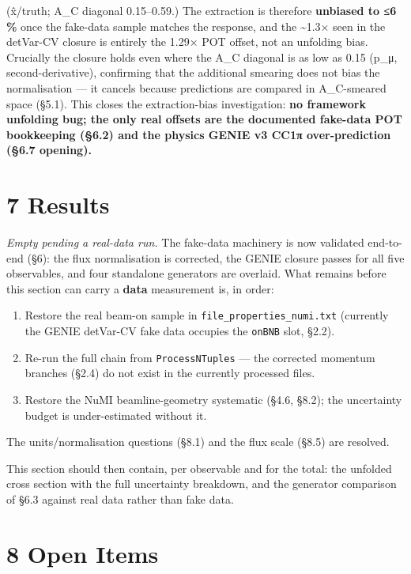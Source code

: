 \documentclass[11pt]{article}
\begin{document}
(x̂/truth; A\_C diagonal 0.15–0.59.) The extraction is therefore \textbf{unbiased to ≤6 \%} once the fake-data sample matches the response, and the \textasciitilde{}1.3× seen in the detVar-CV closure is entirely the 1.29× POT offset, not an unfolding bias. Crucially the closure holds even where the A\_C diagonal is as low as 0.15 (p\_μ, second-derivative), confirming that the additional smearing does not bias the normalisation — it cancels because predictions are compared in A\_C-smeared space (§5.1). This closes the extraction-bias investigation: \textbf{no framework unfolding bug; the only real offsets are the documented fake-data POT bookkeeping (§6.2) and the physics GENIE v3 CC1π over-prediction (§6.7 opening).}

\section*{7 Results}

\emph{Empty pending a real-data run.} The fake-data machinery is now validated end-to-end (§6): the flux normalisation is corrected, the GENIE closure passes for all five observables, and four standalone generators are overlaid. What remains before this section can carry a \textbf{data} measurement is, in order:

\begin{enumerate}
\item Restore the real beam-on sample in \texttt{file\_properties\_numi.txt} (currently the GENIE detVar-CV fake data occupies the \texttt{onBNB} slot, §2.2).
\item Re-run the full chain from \texttt{ProcessNTuples} — the corrected momentum branches (§2.4) do not exist in the currently processed files.
\item Restore the NuMI beamline-geometry systematic (§4.6, §8.2); the uncertainty budget is under-estimated without it.
\end{enumerate}

The units/normalisation questions (§8.1) and the flux scale (§8.5) are resolved.

This section should then contain, per observable and for the total: the unfolded cross section with the full uncertainty breakdown, and the generator comparison of §6.3 against real data rather than fake data.

\section*{8 Open Items}
\end{document}
